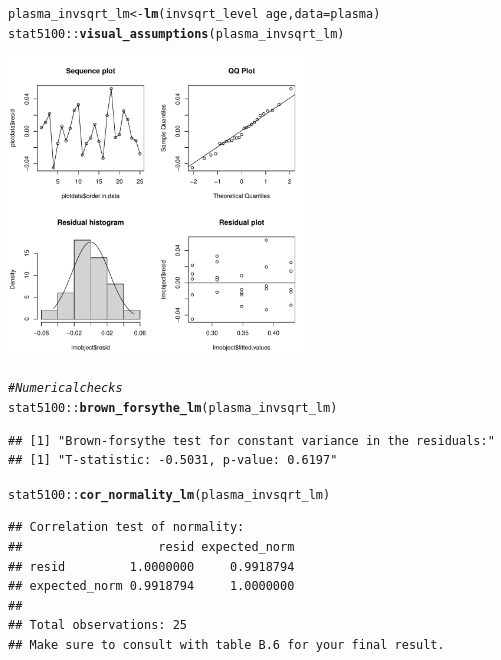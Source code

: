 \documentclass{article}\usepackage[]{graphicx}\usepackage[]{color}
\makeatletter
\newcommand{\hlcom}[1]{\textcolor[rgb]{0.678,0.584,0.686}{\textit{#1}}}%
\newcommand{\hlopt}[1]{\textcolor[rgb]{0,0,0}{#1}}%
\newcommand{\hlstd}[1]{\textcolor[rgb]{0.345,0.345,0.345}{#1}}%
\newcommand{\hlkwb}[1]{\textcolor[rgb]{0.69,0.353,0.396}{#1}}%
\newcommand{\hlkwc}[1]{\textcolor[rgb]{0.333,0.667,0.333}{#1}}%
\newcommand{\hlkwd}[1]{\textcolor[rgb]{0.737,0.353,0.396}{\textbf{#1}}}%
\newenvironment{kframe}{%
 \def\at@end@of@kframe{}%
 \ifinner\ifhmode%
  \def\at@end@of@kframe{\end{minipage}}%
  \begin{minipage}{\columnwidth}%
 \fi\fi%
 \def\FrameCommand##1{\hskip\@totalleftmargin \hskip-\fboxsep
 \colorbox{shadecolor}{##1}\hskip-\fboxsep
     \hskip-\linewidth \hskip-\@totalleftmargin \hskip\columnwidth}%
 \MakeFramed {\advance\hsize-\width
   \@totalleftmargin\z@ \linewidth\hsize
   \@setminipage}}%
 {\par\unskip\endMakeFramed%
 \at@end@of@kframe}
\newenvironment{knitrout}{}{} %
\makeatother
\begin{document}
\begin{knitrout}
\begin{kframe}
\begin{alltt}
\hlstd{plasma_invsqrt_lm} \hlkwb{<-} \hlkwd{lm}\hlstd{(invsqrt_level} \hlopt{~} \hlstd{age,} \hlkwc{data} \hlstd{= plasma)}
\hlstd{stat5100}\hlopt{::}\hlkwd{visual_assumptions}\hlstd{(plasma_invsqrt_lm)}
\end{alltt}
\end{kframe}

{\centering \includegraphics[width=0.6\textwidth]{figure/unnamed-chunk-1-4} 

}


\begin{kframe}\begin{alltt}
\hlcom{# Numerical checks}
\hlstd{stat5100}\hlopt{::}\hlkwd{brown_forsythe_lm}\hlstd{(plasma_invsqrt_lm)}
\end{alltt}
\begin{verbatim}
## [1] "Brown-forsythe test for constant variance in the residuals:"
## [1] "T-statistic: -0.5031, p-value: 0.6197"
\end{verbatim}
\begin{alltt}
\hlstd{stat5100}\hlopt{::}\hlkwd{cor_normality_lm}\hlstd{(plasma_invsqrt_lm)}
\end{alltt}
\begin{verbatim}
## Correlation test of normality:
##                   resid expected_norm
## resid         1.0000000     0.9918794
## expected_norm 0.9918794     1.0000000
## 
## Total observations: 25
## Make sure to consult with table B.6 for your final result.
\end{verbatim}
\end{kframe}
\end{knitrout}
\end{document}
